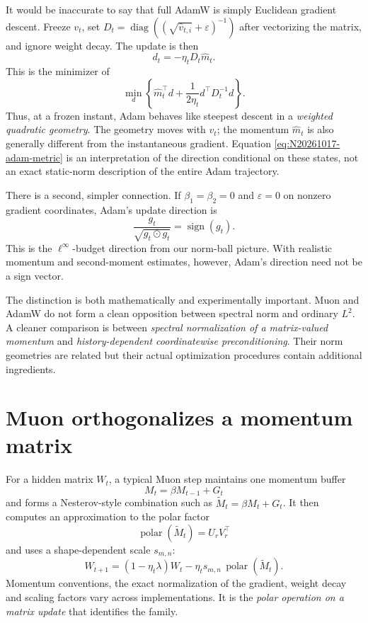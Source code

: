 It would be inaccurate to say that full AdamW is simply Euclidean gradient descent.  Freeze \(v_t\), set \(D_t=\operatorname{diag}((\sqrt{\widehat v_{t,i}}+\varepsilon)^{-1})\) after vectorizing the matrix, and ignore weight decay.  The update is then
\[
 d_t=-\eta_tD_t\widehat m_t.
\]
This is the minimizer of
\begin{equation}
 \min_d\left\{\widehat m_t^\top d+
         \frac{1}{2\eta_t}d^\top D_t^{-1}d\right\}.
 \label{eq:N20261017-adam-metric}
\end{equation}
Thus, at a frozen instant, Adam behaves like steepest descent in a \emph{weighted quadratic geometry}.  The geometry moves with \(v_t\); the momentum \(\widehat m_t\) is also generally different from the instantaneous gradient.  Equation \eqref{eq:N20261017-adam-metric} is an interpretation of the direction conditional on these states, not an exact static-norm description of the entire Adam trajectory.

There is a second, simpler connection.  If \(\beta_1=\beta_2=0\) and \(\varepsilon=0\) on nonzero gradient coordinates, Adam's update direction is
\[
 \frac{g_t}{\sqrt{g_t\odot g_t}}
 =\operatorname{sign}(g_t).
\]
This is the \(\ell^\infty\)-budget direction from our norm-ball picture.  With realistic momentum and second-moment estimates, however, Adam's direction need not be a sign vector.

The distinction is both mathematically and experimentally important.  Muon and AdamW do not form a clean opposition between spectral norm and ordinary \(L^2\).  A cleaner comparison is between \emph{spectral normalization of a matrix-valued momentum} and \emph{history-dependent coordinatewise preconditioning}.  Their norm geometries are related but their actual optimization procedures contain additional ingredients.

\section{Muon orthogonalizes a momentum matrix}

For a hidden matrix \(W_t\), a typical Muon step maintains one momentum buffer
\[
 M_t=\beta M_{t-1}+G_t
\]
and forms a Nesterov-style combination such as
\(\widetilde M_t=\beta M_t+G_t\).
It then computes an approximation to the polar factor
\[
 \operatorname{polar}(\widetilde M_t)
 =U_rV_r^\top
\]
and uses a shape-dependent scale \(s_{m,n}\):
\begin{equation}
 W_{t+1}=(1-\eta_t\lambda)W_t
 -\eta_t s_{m,n}\,\operatorname{polar}(\widetilde M_t).
 \label{eq:N20261017-muon}
\end{equation}
Momentum conventions, the exact normalization of the gradient, weight decay and scaling factors vary across implementations.  It is the \emph{polar operation on a matrix update} that identifies the family.

